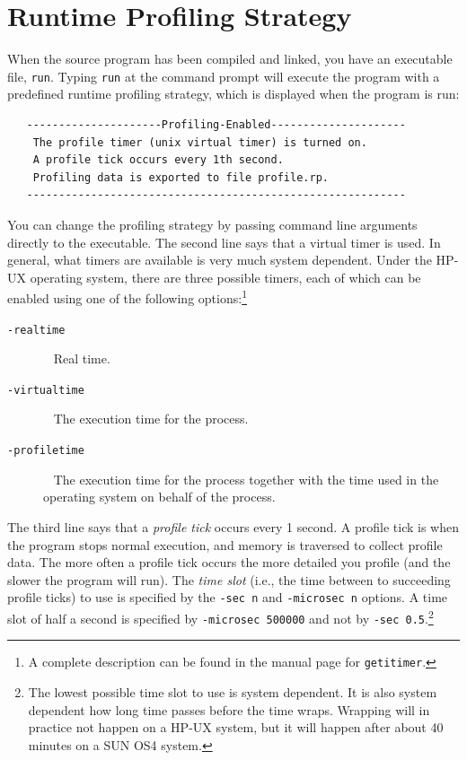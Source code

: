 \documentclass[12pt]{book}
\begin{document}
\section{Runtime Profiling Strategy}
When the source program has been compiled and linked, you have an
executable file, \texttt{run}. Typing \texttt{run} at the command prompt will
execute the program with a predefined 
%
runtime profiling strategy, which is displayed when the program is
run:
\begin{verbatim}
   ---------------------Profiling-Enabled---------------------
    The profile timer (unix virtual timer) is turned on.
    A profile tick occurs every 1th second.
    Profiling data is exported to file profile.rp.
   -----------------------------------------------------------
\end{verbatim}
You can change the 
%
profiling strategy by passing command line arguments directly to the
executable.  The second line says that a virtual timer is used. In general, what timers are available
  is very much system dependent. Under the HP-UX operating system, there
are three possible timers, each of which can be enabled using one of
the following options:\footnote{A complete description can be
    found in the manual page for \texttt{getitimer}.}
\begin{description}
\item[{\tt -realtime}]~
  Real time.
\item[{\tt -virtualtime}]~ 
  The execution time for the process.
\item[{\tt -profiletime}]~
  The execution time for the process together with the time used in
  the operating system on behalf of the process.
\end{description}

The third line says that a 
%
{\em profile tick\/} occurs every 1 second.  A profile tick is when
the program stops normal execution, and memory is traversed to collect
profile data. The more often a profile tick occurs the more detailed
you profile (and the slower the program will run). The
%
{\em time slot\/} (i.e., the time between to succeeding profile ticks) to use
is specified by the 
%
\texttt{-sec n} and 
%
\texttt{-microsec n} options. A time slot of half a second is
specified by \texttt{-microsec 500000} and not by \texttt{-sec
  0.5}.\footnote{The lowest possible time slot to use is system
  dependent. It is also system dependent how long time passes
  before the time wraps.  Wrapping will in practice not happen on a HP-UX system,
  but it will happen after about 40 minutes on a SUN OS4 system.}
\end{document}
